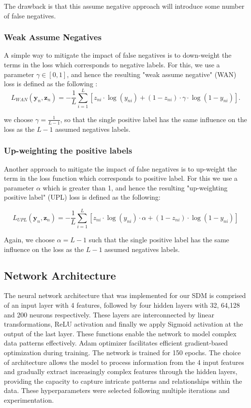\documentclass{article}
\begin{document}
The drawback is that this assume negative approach will introduce some number of false negatives.

\subsubsection{Weak Assume Negatives}

A simple way to mitigate the impact of false negatives is to down-weight the terms in the loss which corresponds to negative labels. For this, we use a parameter $\gamma \in [0, 1]$, and hence the resulting "weak assume negative" (WAN) loss is defined as the following \cite{cole2021multilabel} : 
\begin{equation}
    L_{WAN}(\mathbf{y}_n,\mathbf{z}_n) = -\frac{1}{L} \sum_{i=1}^{L} [z_{ni} \cdot \log(y_{ni}) + (1 - z_{ni}) \cdot \gamma \cdot \log(1 - y_{ni})].
\end{equation}

we choose $\gamma = \frac{1}{L-1}$, so that the single positive label has the same influence on the loss as the $L-1$ assumed negatives labels.

\subsubsection{Up-weighting the positive labels}

Another approach to mitigate the impact of false negatives is to up-weight the term in the loss function which corresponds to positive label. For this we use a parameter  $\alpha$ which is greater than 1, and hence the resulting "up-weighting positive label" (UPL) loss is defined as the following:

\begin{equation}
    L_{UPL}(\mathbf{y}_n,\mathbf{z}_n) = -\frac{1}{L} \sum_{i=1}^{L} [z_{ni} \cdot \log(y_{ni})\cdot\alpha + (1 - z_{ni}) \cdot \log(1 - y_{ni})]
\end{equation}

Again, we choose $\alpha = {L-1}$ such that the single positive label has the same influence on the loss as the $L-1$ assumed negatives labels.
\subsection{Network Architecture}
The neural network architecture that was implemented for our SDM is comprised of an input layer with 4 features, followed by four hidden layers with 32, 64,128 and 200 neurons respectively. These layers are interconnected by linear transformations, ReLU activation and finally we apply Sigmoid activation at the output of the last layer. These functions enable the network to model complex data patterns effectively. Adam optimizer facilitates efficient gradient-based optimization during training. The network is trained for 150 epochs. The choice of architecture allows the model to process information from the 4 input features and gradually extract increasingly complex features through the hidden layers, providing the capacity to capture intricate patterns and relationships within the data. These hyperparameters were selected following multiple iterations and experimentation.
\end{document}

